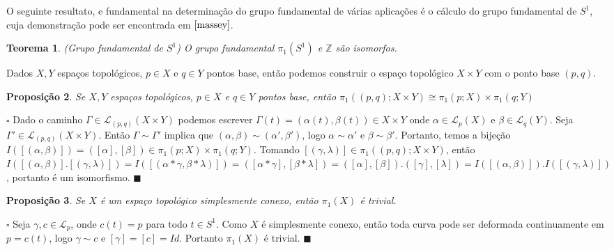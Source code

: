 \documentclass[12pt]{book}
\newtheorem{teorema}{Teorema}[section]
\newtheorem{proposicao}[teorema]{Proposição}
\newenvironment{prova}[1]{$\square$ #1}{\hfill$\blacksquare$}
\newcommand{\caminhospontobase}[1]{\mathcal{L}_{#1}}
\newcommand{\caminhospontobasegeral}[2]{\mathcal{L}_{#1}(#2)}
\newcommand{\circulo}{S^{1}}
\newcommand{\classe}[1]{[#1]}
\newcommand{\grupofundamental}[1]{\pi_{1}(#1)}
\newcommand{\grupofundamentalpontobase}[2]{\pi_{1}(#1; #2)}
\newcommand{\inteiros}{\mathbb{Z}}
\begin{document}
		O seguinte resultato, e fundamental na determinação do grupo fundamental de várias aplicações é o cálculo do grupo fundamental de $\circulo$, cuja demonstração pode ser encontrada em $\cite{massey}$.
		
		\begin{teorema}\label{teorema_grupo_fundamental_circulo}
			(Grupo fundamental de $\circulo$) O grupo fundamental $\grupofundamental{\circulo}$ e $\inteiros$ são isomorfos.
		\end{teorema} 
		
		Dados $X, Y$ espaços topológicos, $p\in X$ e $q\in Y$ pontos base, então podemos construir o espaço topológico $X\times Y$ com o ponto base $(p,q)$.
		
		\begin{proposicao}\label{proposicao_produto_grupo_fundamental}
			Se $X, Y$ espaços topológicos, $p\in X$ e $q\in Y$ pontos base, então $\grupofundamentalpontobase{(p,q)}{X\times Y} \cong \grupofundamentalpontobase{p}{X}\times \grupofundamentalpontobase{q}{Y}$
		\end{proposicao}
		\begin{prova}
			Dado o caminho $\Gamma \in \caminhospontobasegeral{(p,q)}{X\times Y}$ podemos escrever $\Gamma(t) = (\alpha(t), \beta(t)) \in X\times Y$ onde $\alpha \in \caminhospontobasegeral{p}{X}$ e $\beta \in \caminhospontobasegeral{q}{Y}$. Seja $\Gamma' \in \caminhospontobasegeral{(p,q)}{X\times Y}$. Então $\Gamma \sim \Gamma'$ implica que $ (\alpha, \beta) \sim (\alpha', \beta')$, logo $\alpha \sim \alpha'$ e $\beta \sim \beta'$. Portanto, temos a bijeção $I(\classe{ (\alpha, \beta)}) =  (\classe{\alpha}, \classe{\beta}) \in \grupofundamentalpontobase{p}{X}\times \grupofundamentalpontobase{q}{Y}$. Tomando $\classe{(\gamma, \lambda)} \in \grupofundamentalpontobase{(p,q)}{X\times Y}$, então $I(\classe{(\alpha, \beta)} .\classe{(\gamma, \lambda)} ) = I(\classe{(\alpha*\gamma, \beta*\lambda)} ) = (\classe{\alpha*\gamma}, \classe{\beta*\lambda})=(\classe{\alpha}, \classe{\beta}) .(\classe{\gamma}, \classe{\lambda}) = I(\classe{(\alpha, \beta)} ).I(\classe{(\gamma, \lambda)} )$, portanto é um isomorfismo.
		\end{prova}
		
		\begin{proposicao}\label{proposicao_grupo_fundamental_simplesmente_conexo}
			Se $X$ é um espaço topológico simplesmente conexo, então $\grupofundamental{X}$ é trivial.
		\end{proposicao}
		\begin{prova}
			Seja $\gamma, c \in \caminhospontobase{p}$, onde $c(t)=p$ para todo $t\in \circulo$. Como $X$ é simplesmente conexo, então toda curva pode ser deformada continuamente em $p=c(t)$, logo $\gamma \sim c$ e $\classe{\gamma} = \classe{c} = Id$. Portanto $\grupofundamental{X}$ é trivial.
		\end{prova}
		
\end{document}
